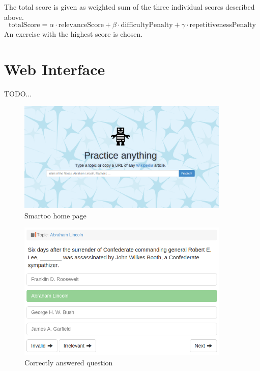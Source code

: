 \documentclass[a4paper, 12pt, twoside]{fithesis2}		%
\renewcommand{\_}{\leavevmode \kern0.0em\vbox{\hrule width0.4em}}
\begin{document}
The total score is given as weighted sum of the three individual scores described above.
$$
\text{totalScore} = \alpha \cdot \text{relevanceScore} + \beta \cdot \text{difficultyPenalty} + \gamma \cdot \text{repetitivenessPenalty}
$$
An exercise with the highest score is chosen.


\section{Web Interface}
\label{sec:smartoo-web}

TODO...

\begin{figure}[h]
  \centering
  \includegraphics[width=0.9\textwidth]{images/home-page.png}
  \caption{Smartoo home page}
  \label{fig:smartoo-home}
\end{figure}

\begin{figure}[h]
  \centering
  \includegraphics[width=0.9\textwidth]{images/answered-correctly.png}
  \caption{Correctly answered question}
  \label{fig:correctly-answered-question}
\end{figure}
\end{document}
